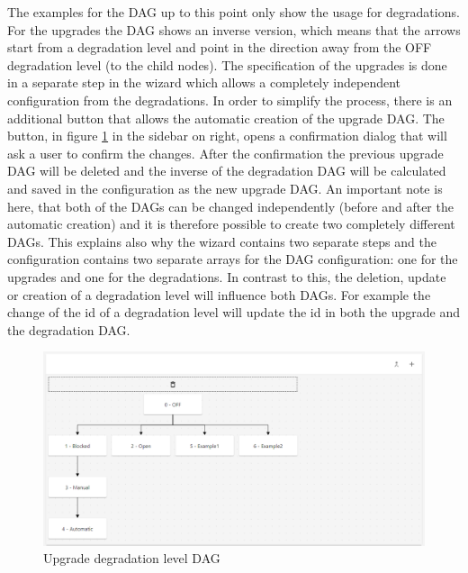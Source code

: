 The examples for the DAG up to this point only show the usage for degradations. For the upgrades the DAG shows an inverse version, which means that the arrows start from a degradation level and point in the direction away from the OFF degradation level (to the child nodes). The specification of the upgrades is done in a separate step in the wizard which allows a completely independent configuration from the degradations. In order to simplify the process, there is an additional button that allows the automatic creation of the upgrade DAG. The button, in figure \ref{fig:upgrade_level_tree_drop} in the sidebar on right, opens a confirmation dialog that will ask a user to confirm the changes. After the confirmation the previous upgrade DAG will be deleted and the inverse of the degradation DAG will be calculated and saved in the configuration as the new upgrade DAG. An important note is here, that both of the DAGs can be changed independently (before and after the automatic creation) and it is therefore possible to create two completely different DAGs. This explains also why the wizard contains two separate steps and the configuration contains two separate arrays for the DAG configuration: one for the upgrades and one for the degradations. In contrast to this, the deletion, update or creation of a degradation level will influence both DAGs. For example the change of the id of a degradation level will update the id in both the upgrade and the degradation DAG.

\begin{figure}[ht]
    \centering
    \includegraphics[width=\textwidth]{img/upgrade_tree.png}
    \caption{Upgrade degradation level DAG}
    \label{fig:upgrade_level_tree_drop}
\end{figure}


